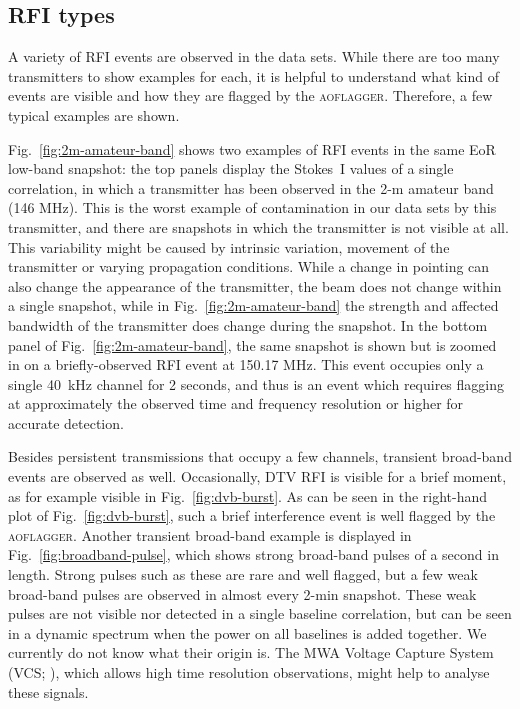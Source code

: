\documentclass{pasa}
\begin{document}
\subsection{RFI types}
A variety of RFI events are observed in the data sets. While there are too many transmitters to show examples for each, it is helpful to understand what kind of events are visible and how they are flagged by the \textsc{aoflagger}. Therefore, a few typical examples are shown.

Fig.~\ref{fig:2m-amateur-band} shows two examples of RFI events in the same EoR low-band snapshot: the top panels display the Stokes~I values of a single correlation, in which a transmitter has been observed in the 2-m amateur band (146 MHz). This is the worst example of contamination in our data sets by this transmitter, and there are snapshots in which the transmitter is not visible at all. This variability might be caused by intrinsic variation, movement of the transmitter or varying propagation conditions. While a change in pointing can also change the appearance of the transmitter, the beam does not change within a single snapshot, while in Fig.~\ref{fig:2m-amateur-band} the strength and affected bandwidth of the transmitter does change during the snapshot. In the bottom panel of Fig.~\ref{fig:2m-amateur-band}, the same snapshot is shown but is zoomed in on a briefly-observed RFI event at 150.17 MHz. This event occupies only a single 40~kHz channel for 2 seconds, and thus is an event which requires flagging at approximately the observed time and frequency resolution or higher for accurate detection.

Besides persistent transmissions that occupy a few channels, transient broad-band events are observed as well. Occasionally, DTV RFI is visible for a brief moment, as for example visible in Fig.~\ref{fig:dvb-burst}. As can be seen in the right-hand plot of Fig.~\ref{fig:dvb-burst}, such a brief interference event is well flagged by the \textsc{aoflagger}. Another transient broad-band example is displayed in Fig.~\ref{fig:broadband-pulse}, which shows strong broad-band pulses of a second in length. Strong pulses such as these are rare and well flagged, but a few weak broad-band pulses are observed in almost every 2-min snapshot. These weak pulses are not visible nor detected in a single baseline correlation, but can be seen in a dynamic spectrum when the power on all baselines is added together. We currently do not know what their origin is. The MWA Voltage Capture System (VCS; \citealt{mwa-voltage-capture-2014}), which allows high time resolution observations, might help to analyse these signals.
\end{document}
